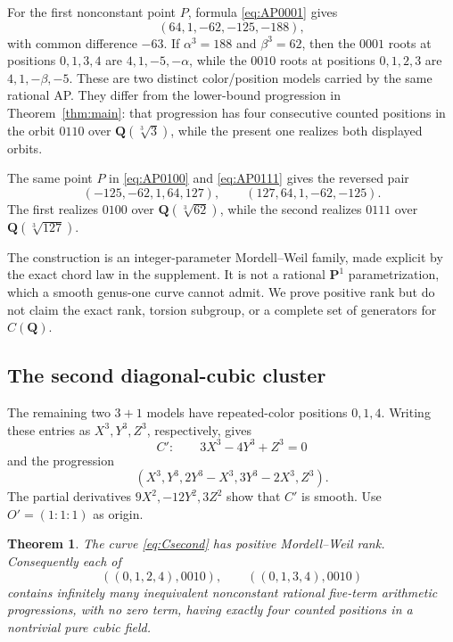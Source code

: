 \documentclass[10pt]{article}
\newtheorem{theorem}{Theorem}[section]
\newcommand{\Q}{\mathbf Q}
\begin{document}
For the first nonconstant point $P$, formula \eqref{eq:AP0001} gives
\[
 (64,1,-62,-125,-188),
\]
with common difference $-63$.  If $\alpha^3=188$ and $\beta^3=62$, then the
$0001$ roots at positions $0,1,3,4$ are $4,1,-5,-\alpha$, while the $0010$
roots at positions $0,1,2,3$ are $4,1,-\beta,-5$.  These are two distinct
color/position models carried by the same rational AP.  They differ from the lower-bound progression
in Theorem~\ref{thm:main}: that progression has four consecutive counted
positions in the orbit $0110$ over $\Q(\sqrt[3]{3})$, while the present one
realizes both displayed orbits.

The same point $P$ in \eqref{eq:AP0100} and \eqref{eq:AP0111} gives the
reversed pair
\[
 (-125,-62,1,64,127),\qquad (127,64,1,-62,-125).
\]
The first realizes $0100$ over $\Q(\sqrt[3]{62})$, while the second realizes
$0111$ over $\Q(\sqrt[3]{127})$.

The construction is an integer-parameter Mordell--Weil family, made explicit
by the exact chord law in the supplement.  It is not a rational
$\mathbf P^1$ parametrization, which a smooth genus-one curve cannot admit.
We prove positive rank but do not claim the exact rank, torsion subgroup, or a
complete set of generators for $C(\Q)$.

\subsection{The second diagonal-cubic cluster}

The remaining two $3+1$ models have repeated-color positions $0,1,4$.
Writing these entries as $X^3,Y^3,Z^3$, respectively, gives
\begin{equation}\label{eq:Csecond}
 C':\qquad 3X^3-4Y^3+Z^3=0
\end{equation}
and the progression
\begin{equation}\label{eq:APsecond}
 (X^3,Y^3,2Y^3-X^3,3Y^3-2X^3,Z^3).
\end{equation}
The partial derivatives $9X^2,-12Y^2,3Z^2$ show that $C'$ is smooth.
Use $O'=(1:1:1)$ as origin.

\begin{theorem}\label{thm:second3plus1}
The curve \eqref{eq:Csecond} has positive Mordell--Weil rank.  Consequently
each of
\[
 ((0,1,2,4),0010),\qquad ((0,1,3,4),0010)
\]
contains infinitely many inequivalent nonconstant rational five-term
arithmetic progressions, with no zero term, having exactly four counted
positions in a nontrivial pure cubic field.
\end{theorem}
\end{document}
